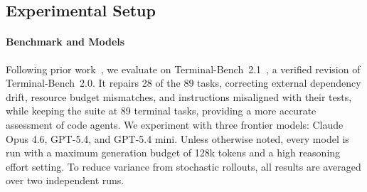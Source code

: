 \documentclass{article}
\begin{document}
\subsection{Experimental Setup}

\paragraph{Benchmark and Models} Following prior work~\citep{leeMetaHarnessEndtoEndOptimization2026, lin2026agentic, zhang2026harnessing}, we evaluate on Terminal-Bench~2.1~\citep{merrill2026terminal}, a verified revision of Terminal-Bench~2.0. It repairs 28 of the 89 tasks, correcting external dependency drift, resource budget mismatches, and instructions misaligned with their tests, while keeping the suite at 89 terminal tasks, providing a more accurate assessment of code agents. We experiment with three frontier models: Claude Opus 4.6, GPT-5.4, and GPT-5.4 mini. Unless otherwise noted, every model is run with a maximum generation budget of 128k tokens and a high reasoning effort setting. To reduce variance from stochastic rollouts, all results are averaged over two independent runs.



\end{document}
